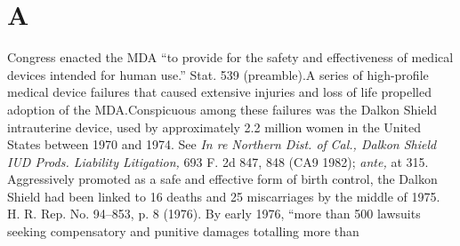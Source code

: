 \section{A}

  Congress enacted the MDA ``to provide for the safety and
effectiveness of medical devices intended for human use.'' 
Stat. 539 (preamble).A series of high-profile medical device failures
that caused extensive injuries and loss of life propelled adoption of
the MDA.\footnotemark[5] Conspicuous among these failures was the Dalkon Shield
intrauterine device, used by approximately 2.2 million women in the
United States between 1970 and 1974. See \emph{In re Northern Dist. of}
\emph{Cal., Dalkon Shield IUD Prods. Liability Litigation,} 693 F. 2d
847, 848 (CA9 1982); \emph{ante,} at 315. Aggressively promoted as a
safe and effective form of birth control, the Dalkon Shield had been
linked to 16 deaths and 25 miscarriages by the middle of 1975. H.
R. Rep. No. 94--853, p. 8 (1976). By early 1976, ``more than 500
lawsuits seeking compensatory and punitive damages totalling more than
